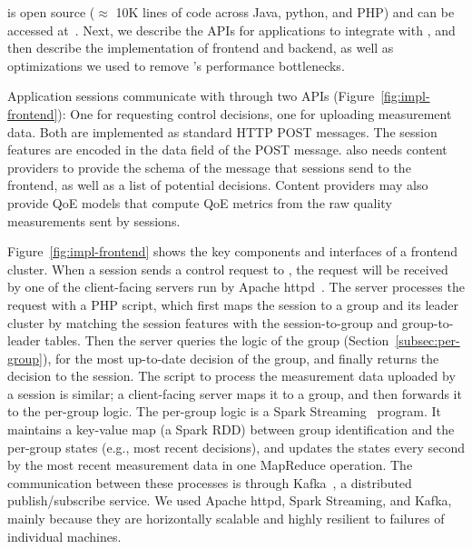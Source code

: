 \name is open source ($\approx$ 10K lines of code across Java, python,
and PHP) and can be accessed at~\cite{ddn-source}.  Next, we describe the APIs
for applications to integrate with \name, and then describe the implementation
of frontend and backend, as well as optimizations we used to remove \name's performance
bottlenecks. 


Application sessions communicate with \name through two APIs
(Figure~\ref{fig:impl-frontend}): One for requesting control decisions, one for
uploading measurement data.  Both are implemented as standard HTTP POST
messages.  The session features are encoded in
the data field of the POST message.
\name also needs content providers to provide the schema of the message that 
 sessions send to the \name frontend, as well as a list of potential decisions.
Content providers may also provide QoE models that compute QoE metrics from 
the raw quality measurements sent by sessions.


Figure~\ref{fig:impl-frontend} shows the key components and interfaces of a
frontend cluster.  When a session sends a control request to \name, the request
will be received by one of the client-facing servers run by Apache
httpd~\cite{httpd}.  The server processes the request with a PHP script, which
first maps the session to a group and its leader cluster by matching
the session features with the session-to-group and group-to-leader tables.
Then the server queries the \mab
logic of the group (Section~\ref{subsec:per-group}), for the most up-to-date
decision of the group, and finally returns the decision to the session.  The
script to process the measurement data uploaded by a session is similar; a
client-facing server maps it to a group, and then forwards it to the per-group
\mab logic. The per-group \mab
logic is a Spark Streaming~\cite{sparkstreaming} program. It maintains a
key-value map (a Spark RDD) between group identification and the per-group \mab states (e.g., most recent decisions),
and updates the states every second by the most recent measurement data in one
MapReduce operation.  
 The communication between these processes is through
Kafka~\cite{kafka}, a distributed publish/subscribe service.  
We used Apache httpd, Spark Streaming, and Kafka, mainly
because they are horizontally scalable and highly resilient to failures of
individual machines.

